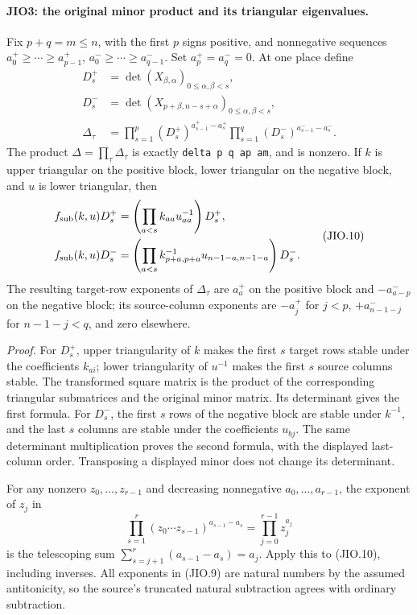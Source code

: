 \paragraph{JIO3: the original minor product and its triangular eigenvalues.}
\label{claim:JIO3}
Fix \(p+q=m\le n\), with the first \(p\) signs positive, and
nonnegative sequences \(a^+_0\ge\cdots\ge a^+_{p-1}\),
\(a^-_0\ge\cdots\ge a^-_{q-1}\).  Set \(a^+_p=a^-_q=0\).
At one place define
\[
 \begin{split}
 D^+_s&=\det(X_{\beta,\alpha})_{0\le\alpha,\beta<s},\\
 D^-_s&=\det(X_{p+\beta,n-s+\alpha})_{0\le\alpha,\beta<s},\\
 \Delta_\tau&=\prod_{s=1}^{p}(D^+_s)^{a^+_{s-1}-a^+_s}
               \prod_{s=1}^{q}(D^-_s)^{a^-_{s-1}-a^-_s}.
 \end{split}
 \tag{JIO.9}
\]
The product \(\Delta=\prod_\tau\Delta_\tau\) is exactly
\texttt{delta p q ap am}, and is nonzero.
If \(k\) is upper triangular on the positive block, lower triangular
on the negative block, and \(u\) is lower triangular, then
\[
 \begin{split}
 f_{\rm sub}(k,u)D^+_s
    &=\left(\prod_{a<s} k_{aa}u_{aa}^{-1}\right)D^+_s,\\
 f_{\rm sub}(k,u)D^-_s
    &=\left(\prod_{a<s} k_{p+a,p+a}^{-1}
                                  u_{n-1-a,n-1-a}\right)D^-_s.
 \end{split}
 \tag{JIO.10}
\]
The resulting target-row exponents of \(\Delta_\tau\) are
\(a^+_a\) on the positive block and \(-a^-_{a-p}\) on the
negative block; its source-column exponents are
\(-a^+_j\) for \(j<p\), \(+a^-_{n-1-j}\) for \(n-1-j<q\),
and zero elsewhere.

\emph{Proof.}
For \(D^+_s\), upper triangularity of \(k\) makes the first \(s\)
target rows stable under the coefficients \(k_{ai}\);
lower triangularity of \(u^{-1}\) makes the first \(s\)
source columns stable.  The transformed square matrix is the
product of the corresponding triangular submatrices and the
original minor matrix.  Its determinant gives the first formula.
For \(D^-_s\), the first \(s\) rows of the negative block are
stable under \(k^{-1}\), and the last \(s\) columns are stable
under the coefficients \(u_{bj}\).  The same determinant
multiplication proves the second formula, with the displayed
last-column order.  Transposing a displayed minor does not
change its determinant.

For any nonzero \(z_0,\ldots,z_{r-1}\) and decreasing
nonnegative \(a_0,\ldots,a_{r-1}\), the exponent of \(z_j\) in
\[
          \prod_{s=1}^{r}
                (z_0\cdots z_{s-1})^{a_{s-1}-a_s}
                  =\prod_{j=0}^{r-1}z_j^{a_j}
 \tag{JIO.11}
\]
is the telescoping sum
\(\sum_{s=j+1}^{r}(a_{s-1}-a_s)=a_j\).
Apply this to (JIO.10), including inverses.
All exponents in (JIO.9) are natural numbers by the assumed
antitonicity, so the source's truncated natural subtraction
agrees with ordinary subtraction.

